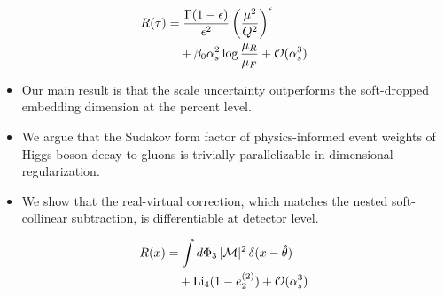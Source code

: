 \begin{align}
  R(\tau) &= \frac{\Gamma(1-\epsilon)}{\epsilon^{2}} \left(\frac{\mu^2}{Q^2}\right)^{\epsilon} \nonumber \\
  &\quad + \beta_0 \alpha_s^2 \log\frac{\mu_R}{\mu_F} + \mathcal{O}(\alpha_s^3) \label{eq:11}
\end{align}

\begin{itemize}
  \item Our main result is that the scale uncertainty outperforms the soft-dropped embedding dimension at the percent level.
  \item We argue that the Sudakov form factor of physics-informed event weights of Higgs boson decay to gluons is trivially parallelizable in dimensional regularization.
  \item We show that the real-virtual correction, which matches the nested soft-collinear subtraction, is differentiable at detector level.
\end{itemize}

\begin{align}
  R(x) &= \int d\Phi_{3} \, |\mathcal{M}|^2 \, \delta(x - \hat{\theta}) \nonumber \\
  &\quad + \mathrm{Li}_{4}(1 - e_2^{(2)}) + \mathcal{O}(\alpha_s^3) \label{eq:12}
\end{align}

